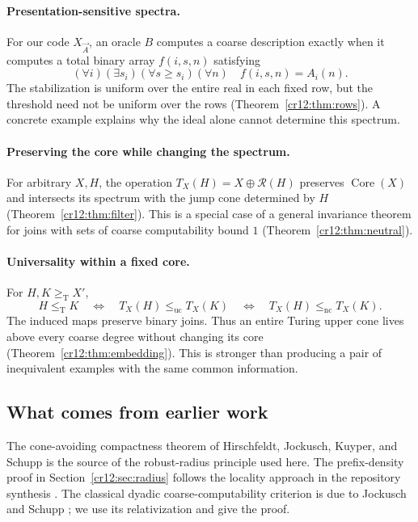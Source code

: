 \documentclass[11pt,letterpaper]{article}
\theoremstyle{plain}
\theoremstyle{definition}
\theoremstyle{remark}
\numberwithin{equation}{section}
\newcommand{\leT}{\leq_{\mathrm T}}
\newcommand{\geT}{\geq_{\mathrm T}}
\newcommand{\leuc}{\leq_{\mathrm{uc}}}
\newcommand{\lenc}{\leq_{\mathrm{nc}}}
\newcommand{\Core}{\operatorname{Core}}
\newcommand{\Rcode}{\mathcal R}
\begin{document}
\paragraph{Presentation-sensitive spectra.}
For our code $X_{\vec A}$, an oracle $B$ computes a coarse description exactly
when it computes a total binary array $f(i,s,n)$ satisfying
\[
 (\forall i)(\exists s_i)(\forall s\ge s_i)(\forall n)\quad
 f(i,s,n)=A_i(n).
\]
The stabilization is uniform over the entire real in each fixed row, but the
threshold need not be uniform over the rows (Theorem~\ref{cr12:thm:rows}). A concrete
example explains why the ideal alone cannot determine this spectrum.

\paragraph{Preserving the core while changing the spectrum.}
For arbitrary $X,H$, the operation $T_X(H)=X\oplus\Rcode(H)$ preserves
$\Core(X)$ and intersects its spectrum with the jump cone determined by $H$
(Theorem~\ref{cr12:thm:filter}). This is a special case of a general invariance theorem
for joins with sets of coarse computability bound $1$
(Theorem~\ref{cr12:thm:neutral}).

\paragraph{Universality within a fixed core.}
For $H,K\geT X'$,
\[
 H\leT K
 \quad\Longleftrightarrow\quad
 T_X(H)\leuc T_X(K)
 \quad\Longleftrightarrow\quad
 T_X(H)\lenc T_X(K).
\]
The induced maps preserve binary joins. Thus an entire Turing upper cone lives
above every coarse degree without changing its core
(Theorem~\ref{cr12:thm:embedding}). This is stronger than producing a pair of
inequivalent examples with the same common information.

\subsection{What comes from earlier work}\label{cr12:sec:earlier}
The cone-avoiding compactness theorem of Hirschfeldt, Jockusch, Kuyper, and
Schupp \cite[Theorem~3.7]{HJKS} is the source of the robust-radius principle
used here. The prefix-density proof in Section~\ref{cr12:sec:radius} follows the
locality approach in the repository synthesis \cite{Repo}. The classical dyadic
coarse-computability criterion is due to Jockusch and Schupp
\cite[Theorem~2.19]{JS}; we use its relativization and give the proof.
\end{document}
